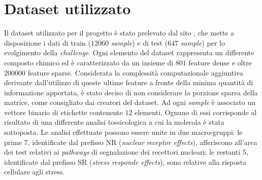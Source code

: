 \section{Dataset utilizzato}
Il dataset utilizzato per il progetto è stato prelevato dal sito \cite{dataset_site}, che mette a disposizione i dati di train ($12060$ \textit{sample}) e di test ($647$ \textit{sample}) per lo svolgimento della \textit{challenge}.
Ogni elemento del dataset rappresenta un differente composto chimico ed è caratterizzato da un insieme di $801$ feature dense e oltre $200000$ feature sparse. Considerata la complessità computazionale aggiuntiva derivante dall'utilizzo di queste ultime feature a fronte della minima quantità di informazione apportata, è stato deciso di non considerare la porzione sparsa della matrice, come consigliato dai creatori del dataset.
Ad ogni \textit{sample} è associato un vettore binario di etichette contenente $12$ elementi.
Ognuno di essi corrisponde al risultato di una differente analisi tossicologica a cui la molecola è stata sottoposta. Le analisi effettuate possono essere unite in due macro-gruppi: le prime $7$, identificate dal prefisso NR (\textit{nuclear receptor effects}), afferiscono all'area dei test relativi ai \textit{pathways} di segnalazione dei recettori nucleari; le restanti $5$, identificate dal prefisso SR (\textit{stress responde effects}), sono relative alla risposta cellulare agli stress.


